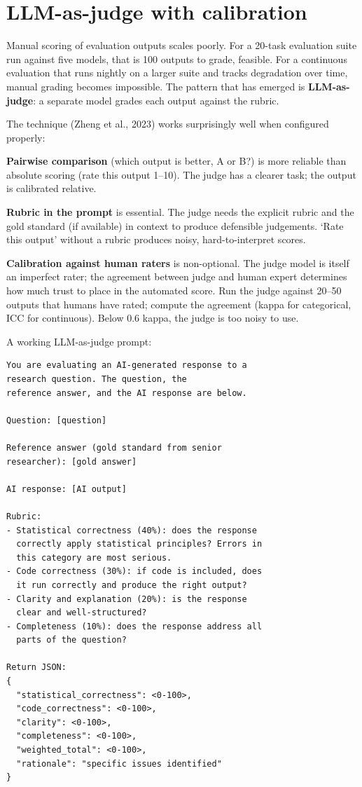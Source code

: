 \documentclass[
  letterpaper,
  11pt]{scrbook}
\begin{document}
\section{LLM-as-judge with
calibration}\label{llm-as-judge-with-calibration}

Manual scoring of evaluation outputs scales poorly. For a 20-task
evaluation suite run against five models, that is 100 outputs to grade,
feasible. For a continuous evaluation that runs nightly on a larger
suite and tracks degradation over time, manual grading becomes
impossible. The pattern that has emerged is \textbf{LLM-as-judge}: a
separate model grades each output against the rubric.

The technique (Zheng et al., 2023) works surprisingly well when
configured properly:

\textbf{Pairwise comparison} (which output is better, A or B?) is more
reliable than absolute scoring (rate this output 1--10). The judge has a
clearer task; the output is calibrated relative.

\textbf{Rubric in the prompt} is essential. The judge needs the explicit
rubric and the gold standard (if available) in context to produce
defensible judgements. `Rate this output' without a rubric produces
noisy, hard-to-interpret scores.

\textbf{Calibration against human raters} is non-optional. The judge
model is itself an imperfect rater; the agreement between judge and
human expert determines how much trust to place in the automated score.
Run the judge against 20--50 outputs that humans have rated; compute the
agreement (kappa for categorical, ICC for continuous). Below 0.6 kappa,
the judge is too noisy to use.

A working LLM-as-judge prompt:

\begin{verbatim}
You are evaluating an AI-generated response to a
research question. The question, the
reference answer, and the AI response are below.

Question: [question]

Reference answer (gold standard from senior
researcher): [gold answer]

AI response: [AI output]

Rubric:
- Statistical correctness (40%): does the response
  correctly apply statistical principles? Errors in
  this category are most serious.
- Code correctness (30%): if code is included, does
  it run correctly and produce the right output?
- Clarity and explanation (20%): is the response
  clear and well-structured?
- Completeness (10%): does the response address all
  parts of the question?

Return JSON:
{
  "statistical_correctness": <0-100>,
  "code_correctness": <0-100>,
  "clarity": <0-100>,
  "completeness": <0-100>,
  "weighted_total": <0-100>,
  "rationale": "specific issues identified"
}
\end{verbatim}
\end{document}
